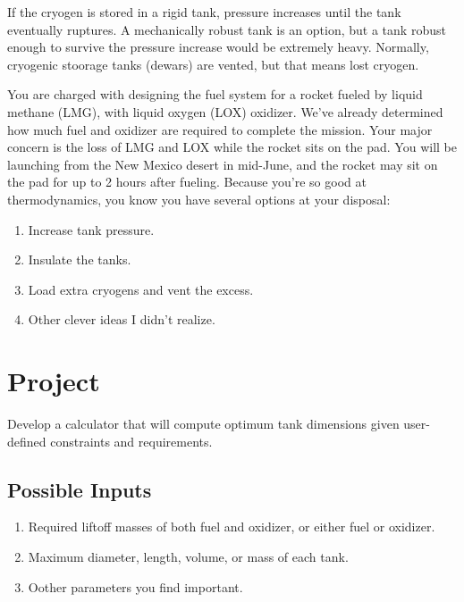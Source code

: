 \documentclass[
]{book}
\providecommand{\tightlist}{%
  \setlength{\itemsep}{0pt}\setlength{\parskip}{0pt}}
\begin{document}
If the cryogen is stored in a rigid tank, pressure increases until the tank eventually ruptures. A mechanically robust tank is an option, but a tank robust enough to survive the pressure increase would be extremely heavy. Normally, cryogenic stoorage tanks (dewars) are vented, but that means lost cryogen.

You are charged with designing the fuel system for a rocket fueled by liquid methane (LMG), with liquid oxygen (LOX) oxidizer.
We've already determined how much fuel and oxidizer are required to complete the mission. Your major concern is the loss of LMG and LOX while the rocket sits on the pad. You will be launching from the New Mexico desert in mid-June, and the rocket may sit on the pad for up to 2 hours after fueling.
Because you're so good at thermodynamics, you know you have several options at your disposal:

\begin{enumerate}
\def\labelenumi{\arabic{enumi}.}
\tightlist
\item
  Increase tank pressure.
\item
  Insulate the tanks.
\item
  Load extra cryogens and vent the excess.
\item
  Other clever ideas I didn't realize.
\end{enumerate}

\hypertarget{project}{%
\section{Project}\label{project}}

Develop a calculator that will compute optimum tank dimensions given user-defined constraints and requirements.

\hypertarget{possible-inputs}{%
\subsection{Possible Inputs}\label{possible-inputs}}

\begin{enumerate}
\def\labelenumi{\arabic{enumi}.}
\tightlist
\item
  Required liftoff masses of both fuel and oxidizer, or either fuel or oxidizer.
\item
  Maximum diameter, length, volume, or mass of each tank.
\item
  Oother parameters you find important.
\end{enumerate}
\end{document}
